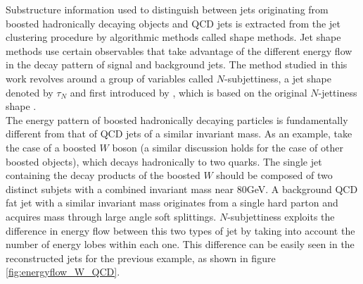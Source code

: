 \documentclass[main]{subfiles} %
\begin{document}
Substructure information used to distinguish between jets originating from boosted hadronically decaying objects and QCD jets is extracted from the jet clustering procedure by algorithmic methods called shape methods. Jet shape methods use certain observables that take advantage of the different energy flow in the decay pattern of signal and background jets. The method studied in this work revolves around a group of variables called $N$-subjettiness, a jet shape denoted by $\tau_N$ and first introduced by \citet{Thaler2011}, which is based on the original $N$-jettiness shape \cite{Stewart2010}.\\

The energy pattern of boosted hadronically decaying particles is fundamentally different from that of QCD jets of a similar invariant mass. As an example, take the case of a boosted $W$ boson (a similar discussion holds for the case of other boosted objects), which decays hadronically to two quarks. The single jet containing the decay products of the boosted $W$ should be composed of two distinct subjets with a combined invariant mass near 80\;GeV. A background QCD fat jet with a similar invariant mass originates from a single hard parton and acquires mass through large angle soft splittings. $N$-subjettiness exploits the difference in energy flow between this two types of jet by taking into account the number of energy lobes within each one. This difference can be easily seen in the reconstructed jets for the previous example, as shown in figure \ref{fig:energyflow_W_QCD}.\\
\end{document}
